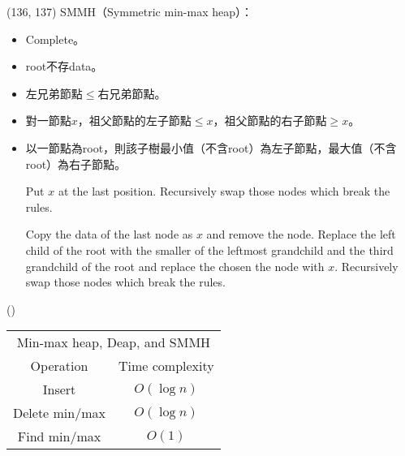 \item \begin{theorem}{(136, 137)} SMMH（Symmetric min-max heap）： \label{smmh}\begin{itemize}
        \item Complete。
        \item root不存data。
        \item 左兄弟節點$\le$右兄弟節點。
        \item 對一節點$x$，祖父節點的左子節點$\le x$，祖父節點的右子節點$\ge x$。
        \item 以一節點為root，則該子樹最小值（不含root）為左子節點，最大值（不含root）為右子節點。
        \begin{algorithm}[H]
            \begin{algorithmic}[1]
                    \State Put $x$ at the last position.
                    \State Recursively swap those nodes which break the rules.
                \EndFunction
            \end{algorithmic}
        \end{algorithm}
        \begin{algorithm}[H]
            \begin{algorithmic}[1]
                    \State Copy the data of the last node as $x$ and remove the node.
                    \State Replace the left child of the root with the smaller of the leftmost grandchild and the third grandchild of the root and replace the chosen the node with $x$.
                    \State Recursively swap those nodes which break the rules.
                \EndFunction
            \end{algorithmic}
        \end{algorithm}
    \end{itemize}
\end{theorem}

\item \begin{theorem}{()} \quad\quad \begin{table}[H]
        \centering
        \begin{tabular}{|c|c|}
            \hline
            \multicolumn{2}{|c|}{Min-max heap, Deap, and SMMH} \\
            \Xhline{3\arrayrulewidth}
            Operation & Time complexity \\
            \Xhline{2\arrayrulewidth}
            Insert & $O(\log n)$ \\
            \hline
            Delete min/max & $O(\log n)$ \\
            \hline
            Find min/max & $O(1)$ \\
            \hline
        \end{tabular}
    \end{table} 
\end{theorem}

